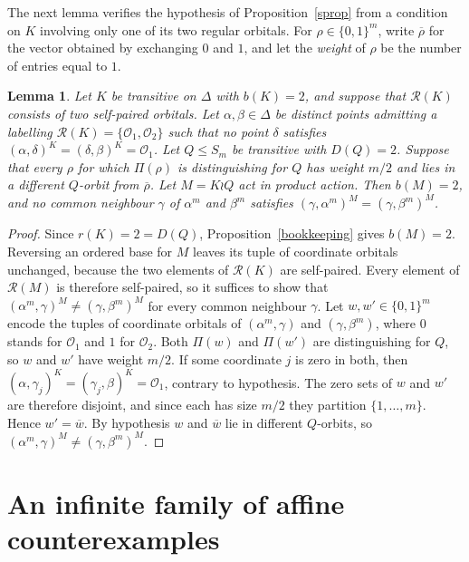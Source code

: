 \documentclass[a4paper,reqno,11pt]{amsart}
\newtheorem{lem}[thm]{Lemma}
\numberwithin{equation}{section}
\begin{document}
The next lemma verifies the hypothesis of Proposition~\ref{sprop} from a condition on $K$ involving only one of its two regular orbitals. For $\rho\in\{0,1\}^m$, write $\overline\rho$ for the vector obtained by exchanging $0$ and $1$, and let the \emph{weight} of $\rho$ be the number of entries equal to $1$.

\begin{lem}\label{wordlem}
Let $K$ be transitive on $\Delta$ with $b(K)=2$, and suppose that $\mathcal R(K)$ consists of two self-paired orbitals. Let $\alpha,\beta\in\Delta$ be distinct points admitting a labelling $\mathcal R(K)=\{\mathcal O_1,\mathcal O_2\}$ such that no point $\delta$ satisfies $(\alpha,\delta)^K=(\delta,\beta)^K=\mathcal O_1$. Let $Q\le S_m$ be transitive with $D(Q)=2$. Suppose that every $\rho$ for which $\Pi(\rho)$ is distinguishing for $Q$ has weight $m/2$ and lies in a different $Q$-orbit from $\overline\rho$. Let $M=K\wr Q$ act in product action. Then $b(M)=2$, and no common neighbour $\gamma$ of $\alpha^m$ and $\beta^m$ satisfies $(\gamma,\alpha^m)^M=(\gamma,\beta^m)^M$.
\end{lem}

\begin{proof}
Since $r(K)=2=D(Q)$, Proposition~\ref{bookkeeping} gives $b(M)=2$. Reversing an ordered base for $M$ leaves its tuple of coordinate orbitals unchanged, because the two elements of $\mathcal R(K)$ are self-paired. Every element of $\mathcal R(M)$ is therefore self-paired, so it suffices to show that $(\alpha^m,\gamma)^M\ne(\gamma,\beta^m)^M$ for every common neighbour $\gamma$. Let $w,w'\in\{0,1\}^m$ encode the tuples of coordinate orbitals of $(\alpha^m,\gamma)$ and $(\gamma,\beta^m)$, where $0$ stands for $\mathcal O_1$ and $1$ for $\mathcal O_2$. Both $\Pi(w)$ and $\Pi(w')$ are distinguishing for $Q$, so $w$ and $w'$ have weight $m/2$. If some coordinate $j$ is zero in both, then $(\alpha,\gamma_j)^K=(\gamma_j,\beta)^K=\mathcal O_1$, contrary to hypothesis. The zero sets of $w$ and $w'$ are therefore disjoint, and since each has size $m/2$ they partition $\{1,\dots,m\}$. Hence $w'=\overline w$. By hypothesis $w$ and $\overline w$ lie in different $Q$-orbits, so $(\alpha^m,\gamma)^M\ne(\gamma,\beta^m)^M$.
\end{proof}

\section{An infinite family of affine counterexamples} \label{sec:affine}
\end{document}
